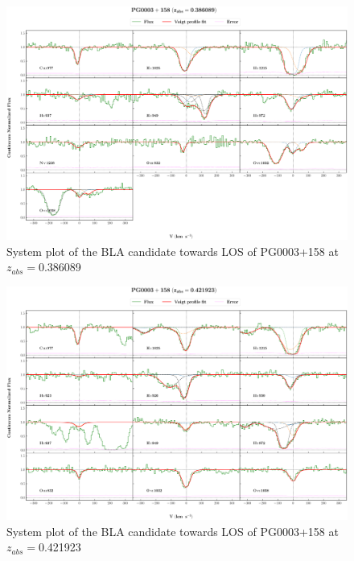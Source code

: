 \begin{landscape}
\begin{figure} 
  \centering  
  \hspace*{-21mm}
    \includegraphics[width=\linewidth]{Figures//system-plots/PG0003+158_z=0.386089_sys_plot.png} 
  \caption{System plot of the BLA candidate towards LOS of PG0003+158 at $z_{abs}=$0.386089} 
\end{figure}



\begin{figure} 
  \centering  
  \hspace*{-21mm}
    \includegraphics[width=\linewidth]{Figures//system-plots/PG0003+158_z=0.421923_sys_plot.png} 
  \caption{System plot of the BLA candidate towards LOS of PG0003+158 at $z_{abs}=$0.421923} 
\end{figure}




\end{landscape}
